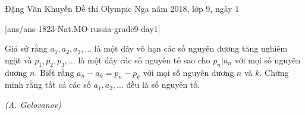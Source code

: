 

\begin{name}
{Đặng Văn Khuyến}
{Đề thi Olympic Nga năm 2018, lớp 9, ngày 1}
\end{name}
\setcounter{ex}{0}
[ans/ans-1823-Nat.MO-russia-grade9-day1]

\begin{ex}%
	Giả sử rằng $a_1,a_2,a_3,\ldots $ là một dãy vô hạn các số nguyên dương tăng nghiêm ngặt và $p_1,p_2,p_3,\ldots $ là một dãy các số nguyên tố sao cho $p_n \vert a_n$ với mọi số nguyên dương $n$. Biết rằng $a_n-a_k=p_n-p_k$ với mọi số nguyên dương $n$ và $k$. Chứng minh rằng tất cả các số $a_1,a_2,\ldots $ đều là số nguyên tố.
\begin{flushright}
	{\it (A. Golovanov)}
\end{flushright}


\end{ex}

